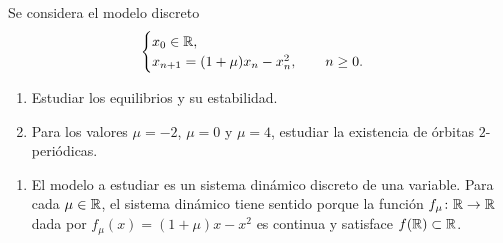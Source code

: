 \documentclass[11pt]{report}
\begin{document}
\begin{exercise}[Junio de 2022]
    Se considera el modelo discreto
    \[\begin{cases}
        x_0\in\mathbb R, \\
        x_{n+1} = (1+\mu)x_n-x_n^2, \qquad n \geq 0.
    \end{cases}\]
    \begin{enumerate}
        \item Estudiar los equilibrios y su estabilidad.
        \item Para los valores $\mu = -2$, $\mu = 0$ y $\mu = 4$, estudiar la existencia de órbitas $2$-periódicas.
    \end{enumerate}
\end{exercise}

\begin{solution}
    \hfill
    \begin{enumerate}
        \item El modelo a estudiar es un sistema dinámico discreto de una variable. Para cada $\mu\in\mathbb R$, el sistema dinámico tiene sentido porque la función $f_\mu \colon\mathbb R\to\mathbb R$ dada por $f_\mu(x) =(1+\mu)x-x^2$ es continua y satisface $f(\mathbb R)\subset\mathbb R$.
    

\end{enumerate}
\end{solution}
\end{document}
